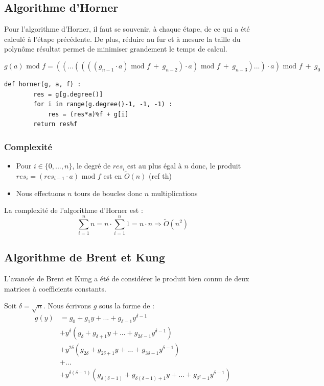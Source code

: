 \documentclass[a4paper]{article}
\begin{document}
\subsection{Algorithme d'Horner}

Pour l'algorithme d'Horner, il faut se souvenir, à chaque étape, de ce qui a été calculé à l'étape précédente. 
De plus, réduire au fur et à mesure la taille du polynôme résultat permet de minimiser grandement le temps de calcul. 
\cite{boldo:hal-02102015}

\[
g(a)\text{ mod }f = ((...((((g_{n-1}\cdot a)\text{ mod }f\ +\ g_{n-2})\cdot a)\text{ mod }f\ +\ g_{n-3})...)\cdot a)\text{ mod }f\ +\ g_0
\]

\begin{lstlisting}[title={Horner}]
    def horner(g, a, f) :
        res = g[g.degree()]
        for i in range(g.degree()-1, -1, -1) :
            res = (res*a)%f + g[i]
        return res%f
\end{lstlisting}

\subsubsection*{Complexité}
\begin{itemize}
    \item Pour $i \in \{0,...,n\}$, le degré de $res_i$ est au plus égal à $n$ donc, le produit $res_i=(res_{i-1}\cdot a)\text{ mod }f$ est en $\tilde{O}(n)$ (ref th)
    \item Nous effectuons $n$ tours de boucles donc $n$ multiplications
\end{itemize}
La complexité de l'algorithme d'Horner est :
\[
\sum_{i=1}^n n=n\cdot \sum_{i=1}^n 1 = n\cdot n\Longrightarrow \tilde{O}(n^2)
\]

\subsection{Algorithme de Brent et Kung}

L'avancée de Brent et Kung a été de considérer le produit bien connu de deux matrices à coefficients constants.
\cite{BrentKung1978}

Soit $\delta = \sqrt{n}$. Nous écrivons $g$ sous la forme de :
\begin{align*}
    g(y) &= g_0 + g_1y + ... + g_{\delta-1}y^{\delta-1} \\
        &+ y^\delta(g_\delta + g_{\delta+1}y + ... + g_{2\delta-1}y^{\delta-1}) \\
                                      &+ y^{2\delta}(g_{2\delta} + g_{2\delta+1}y + ... + g_{3\delta-1}y^{\delta-1}) \\
                                      &+ ... \\
                                      &+ y^{\delta(\delta-1)}(g_{\delta(\delta-1)} + g_{\delta(\delta-1)+1}y + ... + g_{\delta^2-1}y^{\delta-1}) 
\end{align*}
\end{document}
